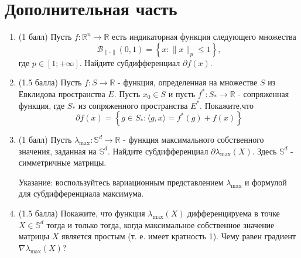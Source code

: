 \documentclass[a5paper,twoside,russian,8pt]{article}
\begin{document}
\section*{Дополнительная часть}
\begin{enumerate}[label=\textbf{Задача \arabic*.}]
    \item (1 балл) Пусть $f: \mathbb{R}^n \to \mathbb{R}$ есть индикаторная функция следующего множества $$\mathcal{B}_{\|\cdot\|}(0, 1) = \left\{x : \| x\|_p \leq 1\right\},$$
    где $p \in [1; +\infty]$. Найдите субдифференциал $\partial f(x)$. 
    
    \item (1.5 балла) Пусть $f: S \to \mathbb{R}$ - функция, определенная на множестве $S$ из Евклидова пространства $E$. Пусть $x_0 \in S$ и пусть $f^*: S_{*} \to \mathbb{R}$ - сопряженная функция, где $S_*$ из сопряженного пространства $E^*$. Покажите,что $$\partial f(x) = \left\{g \in S_{*} : \langle g, x\rangle = f^*(g) + f(x)\right\}$$
    
    \item (1 балл) Пусть $\lambda_{\max}: \mathbb{S}^d \to \mathbb{R}$ - функция максимального собственного значения, заданная на $\mathbb{S}^d$. Найдите субдифференциал $\partial \lambda_{\max}(X)$. Здесь $\mathbb{S}^d$ - симметричные матрицы.
    
    Указание: воспользуйтесь вариационным представлением $\lambda_{\max}$ и формулой для субдифференциала максимума.
    
    \item (1.5 балла) Покажите, что функция $\lambda_{\max}(X)$ дифференцируема в точке $X \in \mathbb{S}^d$ тогда и только тогда, когда максимальное собственное значение матрицы $X$ является простым (т. е. имеет кратность 1). Чему равен градиент $\nabla \lambda_{\max}(X)$?
\end{enumerate}
\end{document}
